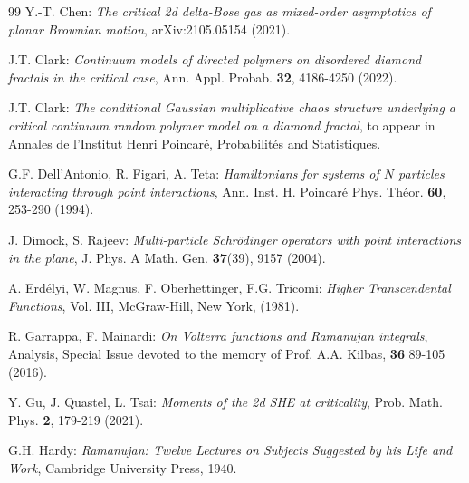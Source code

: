 \documentclass[10pt]{article}
\numberwithin{equation}{section}
\theoremstyle{definition}
\begin{document}
\begin{thebibliography}{99}
 Y.-T. Chen: \emph{The critical 2d delta-Bose gas as mixed-order asymptotics of planar Brownian motion},  \textup{arXiv:2105.05154} (2021). 





 J.T. Clark: \emph{Continuum models of directed polymers on disordered diamond fractals in the critical case},  Ann. Appl. Probab. \textbf{32}, 4186-4250  (2022).


 J.T. Clark: \emph{The conditional Gaussian multiplicative chaos   structure underlying a critical  continuum random  polymer model on a diamond fractal}, to appear in Annales de l'Institut Henri Poincar\'e, Probabilit\'es and Statistiques.

    




 G.F. Dell'Antonio, R. Figari, A. Teta:  \emph{Hamiltonians for systems of $N$ particles interacting through point interactions}, Ann. Inst. H. Poincar\'e  Phys. Th\'eor. \textbf{60},  253-290 (1994).





 J. Dimock, S. Rajeev: \emph{Multi-particle Schr\"odinger operators with point interactions in the plane}, J. Phys. A Math. Gen.  \textbf{37}(39), 9157 (2004).





 A. Erd\'elyi, W. Magnus, F. Oberhettinger, F.G. Tricomi: \emph{Higher Transcendental Functions}, Vol. III,  McGraw-Hill, New York, (1981).




 R. Garrappa, F. Mainardi: \emph{On Volterra functions and Ramanujan integrals}, Analysis, Special Issue devoted to the memory of Prof. A.A. Kilbas, \textbf{36} 89-105 (2016).



 Y. Gu, J. Quastel, L. Tsai: \textit{Moments of the 2d SHE at criticality}, Prob. Math. Phys. \textbf{2}, 179-219  (2021).



 G.H. Hardy: \textit{Ramanujan: Twelve Lectures on Subjects Suggested by his Life and Work}, Cambridge University Press,  1940.










\end{thebibliography}
\end{document}
